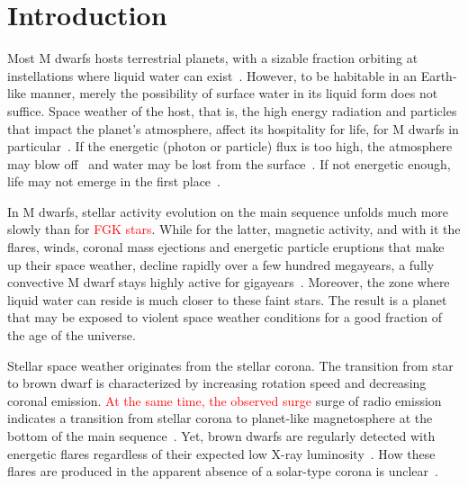 \documentclass[twocolumn]{aastex631}
\begin{document}
\section{Introduction}
\label{sec:intro}
Most M dwarfs hosts terrestrial planets, with a sizable fraction orbiting at instellations where liquid water can exist~\citep{dressing2015occurrence, hardegree-ullman2019kepler, ment2023occurrence}. However, to be habitable in an Earth-like manner, merely the possibility of surface water in its liquid form does not suffice. Space weather of the host, that is, the high energy radiation and particles that impact the planet's atmosphere, affect its hospitality for life, for M dwarfs in particular~\citep{airapetian2020impact}. If the energetic (photon or particle) flux is too high, the atmosphere may blow off~\citep[e.g., ][]{lammer2003atmospheric, garraffo2017threatening, ketzer2022influence} and water may be lost from the surface~\citep{doamaral2022contribution}. If not energetic enough, life may not emerge in the first place~\citep{rimmer2018origin}.

In M dwarfs, stellar activity evolution on the main sequence unfolds much more slowly than for \textcolor{red}{FGK stars}. While for the latter, magnetic activity, and with it the flares, winds, coronal mass ejections and energetic particle eruptions that make up their space weather, decline rapidly over a few hundred megayears, a fully convective M dwarf stays highly active for gigayears~\citep{magaudda2020relation, johnstone2021active, medina2022galactic}. Moreover, the zone where liquid water can reside is much closer to these faint stars. The result is a planet that may be exposed to violent space weather conditions for a good fraction of the age of the universe. 

Stellar space weather originates from the stellar corona. The transition from star to brown dwarf is characterized by increasing rotation speed and decreasing coronal emission. \textcolor{red}{At the same time, the observed surge} surge of radio emission indicates a transition from stellar corona to planet-like magnetosphere at the bottom of the main sequence~\citep{zarka1998auroral,pineda2017panchromatic}. Yet, brown dwarfs are regularly detected with energetic flares regardless of their expected low X-ray luminosity~\citep[e.g., ][]{hambaryan2004new, stelzer2006simultaneous, gizis2013kepler, paudel2020k2, schmidt2019largest}. How these flares are produced in the apparent absence of a solar-type corona is unclear~\citep{mullan2018frequencies}.%
\end{document}

